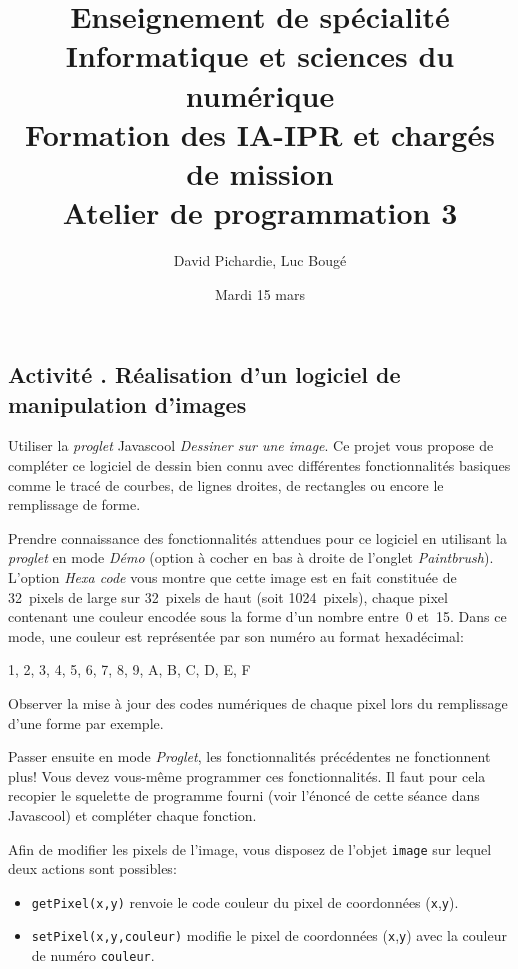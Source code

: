 \documentclass[a4paper,11pt]{article}
\newcounter{activite}%
\def\theactivite{\Roman{activite}}%
\newenvironment{activite}[1]%
{\refstepcounter{activite}%
  \subsection*{Activité \theactivite. #1}}%
{}
\def\|{\lstinline|}%
\begin{document}
\title{Enseignement de spécialité\\
Informatique et sciences du numérique\\
Formation des IA-IPR et chargés de mission\\
Atelier de programmation 3}

\date{Mardi 15 mars}

\author{David Pichardie, Luc Bougé}
\maketitle

\begin{activite}{Réalisation d'un logiciel de manipulation d'images}

Utiliser la \emph{proglet} Javascool \emph{Dessiner sur une
  image}. Ce projet vous propose de compléter ce logiciel de dessin
bien connu avec différentes fonctionnalités basiques comme le tracé de
courbes, de lignes droites, de rectangles ou encore le remplissage de
forme.

Prendre connaissance des fonctionnalités attendues pour ce logiciel en
utilisant la \emph{proglet} en mode \emph{Démo} (option à cocher en
bas à droite de l'onglet \emph{Paintbrush}). L'option \emph{Hexa code}
vous montre que cette image est en fait constituée de 32~pixels de
large sur 32~pixels de haut (soit 1024~pixels), chaque pixel contenant
une couleur encodée sous la forme d'un nombre entre~0 et~15. Dans ce
mode, une couleur est représentée par son numéro au format
hexadécimal:
\begin{center}
  1, 2, 3, 4, 5, 6, 7, 8, 9, A, B, C, D, E, F %.
\end{center}
Observer la mise à jour des codes numériques
de chaque pixel lors du remplissage d'une forme par exemple.

Passer ensuite en mode \emph{Proglet}, les fonctionnalités précédentes ne
fonctionnent plus! Vous devez vous-même programmer ces
fonctionnalités. Il faut pour cela recopier le squelette de programme
fourni (voir l'énoncé de cette séance dans Javascool) et compléter chaque
fonction.

Afin de modifier les pixels de l'image, vous disposez de l'objet
\|image| sur lequel deux actions sont possibles:
\begin{itemize}
\item \|getPixel(x,y)| renvoie le code couleur du pixel de coordonnées
  (\|x|,\|y|).
\item \|setPixel(x,y,couleur)| modifie le pixel de coordonnées
  (\|x|,\|y|) avec la couleur de numéro \|couleur|.
\end{itemize}


\end{activite}
\end{document}
